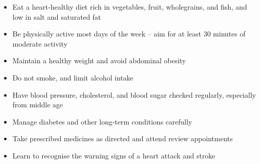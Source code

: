 \begin{itemize}
    \item Eat a heart-healthy diet rich in vegetables, fruit, wholegrains, and fish, and low in salt and saturated fat
    \item Be physically active most days of the week -- aim for at least 30 minutes of moderate activity
    \item Maintain a healthy weight and avoid abdominal obesity
    \item Do not smoke, and limit alcohol intake
    \item Have blood pressure, cholesterol, and blood sugar checked regularly, especially from middle age
    \item Manage diabetes and other long-term conditions carefully
    \item Take prescribed medicines as directed and attend review appointments
    \item Learn to recognise the warning signs of a heart attack and stroke
\end{itemize}
